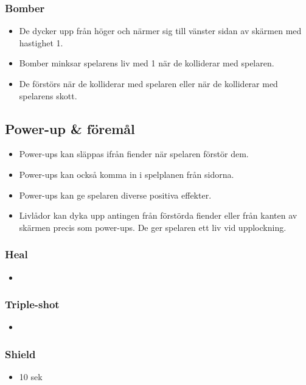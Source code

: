 \documentclass{TDP005mall}
\begin{document}
\subsubsection*{Bomber}
\begin{itemize}
\item De dycker upp från höger och närmer sig till vänster sidan av skärmen med hastighet 1.
\item Bomber minksar spelarens liv med 1 när de kolliderar med spelaren.
\item De förstörs när de kolliderar med spelaren eller när de kolliderar med spelarens skott.

\end{itemize}

\subsection{Power-up \& föremål}

\begin{itemize}
\item Power-ups kan släppas ifrån fiender när spelaren förstör dem.
\item Power-ups kan också komma in i spelplanen från sidorna.
\item Power-ups kan ge spelaren diverse positiva effekter.
\item Livlådor kan dyka upp antingen från förstörda fiender eller från kanten av skärmen precis som power-ups. De ger spelaren ett liv vid upplockning.
\end{itemize}

\subsubsection{Heal}
\begin{itemize}
\item 
\end{itemize}

\subsubsection{Triple-shot}
\begin{itemize}
\item 
\end{itemize}

\subsubsection{Shield}
\begin{itemize}
\item 10 sek
\end{itemize}
\end{document}
